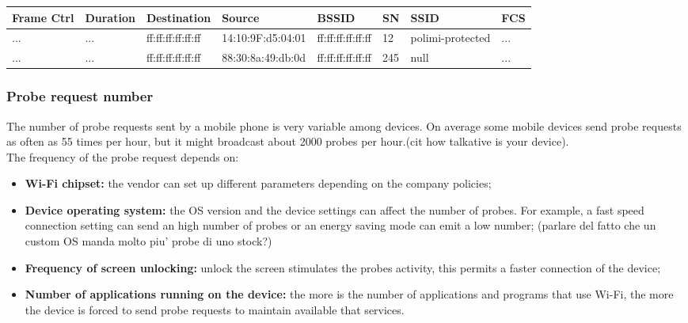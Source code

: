 \begin{tabularx}{\textwidth}{|l|l|l|l|l|l|l|l|}
\hline
 Frame Ctrl & Duration & Destination &Source & BSSID & SN & SSID& FCS \\ \hline
... & ... & ff:ff:ff:ff:ff:ff  & 14:10:9F:d5:04:01 & ff:ff:ff:ff:ff:ff& 12 & polimi-protected & ... \\
... & ... & ff:ff:ff:ff:ff:ff  & 88:30:8a:49:db:0d & ff:ff:ff:ff:ff:ff& 245 & null & ... \\ \hline
\end{tabularx}

\subsubsection{Probe request number}
The number of probe requests sent by a mobile phone is very variable among devices. On average some mobile devices send probe requests as often as 55 times per hour, but it might broadcast about 2000 probes per hour.(cit how talkative is your device).\\
The frequency of the probe request depends on:
\begin{itemize}
\item \textbf{Wi-Fi chipset:} the vendor can set up different parameters depending on the company policies;
\item \textbf{Device operating system:} the OS version and the device settings can affect the number of probes. For example, a fast speed connection setting can send an high number of probes or an energy saving mode can emit a low number; (parlare del fatto che un custom OS manda molto piu' probe di uno stock?)
\item \textbf{Frequency of screen unlocking:} unlock the screen stimulates the probes activity, this permits a faster connection of the device;
\item \textbf{Number of applications running on the device:} the more is the number of applications and programs that use Wi-Fi, the more the device is forced to send probe requests to maintain available that services.
\end{itemize}

